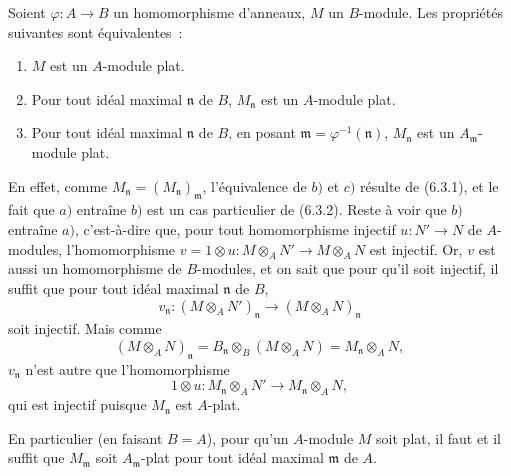 \begin{env}[6.3.3]
\label{0.6.3.3-fr}
Soient $\varphi:A\to B$ un homomorphisme d'anneaux, $M$ un $B$-module. Les
propriétés suivantes sont équivalentes~:
\begin{enumerate}
  \item[$a)$] $M$ est un $A$-module plat.
  \item[$b)$] Pour tout idéal maximal $\mathfrak{n}$ de $B$,
    $M_\mathfrak{n}$ est un $A$-module plat.
  \item[$c)$] Pour tout idéal maximal $\mathfrak{n}$ de $B$, en posant
    $\mathfrak{m}=\varphi^{-1}(\mathfrak{n})$, $M_\mathfrak{n}$ est un
    $A_\mathfrak{m}$-module plat.
\end{enumerate}

En effet, comme $M_\mathfrak{n}=(M_\mathfrak{n})_\mathfrak{m}$,
l'équivalence de $b)$ et $c)$ résulte de (6.3.1), et le fait que $a)$
entraîne $b)$ est un cas particulier de (6.3.2). Reste à voir que $b)$
entraîne $a)$,
c'est-à-dire que, pour tout homomorphisme injectif $u:N'\to N$ de
$A$-modules, l'homomorphisme
$v=1\otimes u:M\otimes_A N'\to M\otimes_A N$ est injectif. Or, $v$ est aussi
un homomorphisme de $B$-modules, et on sait que pour qu'il soit injectif, il
suffit que pour tout idéal maximal $\mathfrak{n}$ de $B$,
\[
  v_\mathfrak{n}:(M\otimes_A N')_\mathfrak{n}
  \longrightarrow(M\otimes_A N)_\mathfrak{n}
\]
soit injectif. Mais comme
\[
  (M\otimes_A N)_\mathfrak{n}
  =B_\mathfrak{n}\otimes_B(M\otimes_A N)
  =M_\mathfrak{n}\otimes_A N,
\]
$v_\mathfrak{n}$ n'est autre que l'homomorphisme
\[
  1\otimes u:M_\mathfrak{n}\otimes_A N'
  \longrightarrow M_\mathfrak{n}\otimes_A N,
\]
qui est injectif puisque $M_\mathfrak{n}$ est $A$-plat.

En particulier (en faisant $B=A$), pour qu'un $A$-module $M$ soit plat, il
faut et il suffit que $M_\mathfrak{m}$ soit $A_\mathfrak{m}$-plat pour tout
idéal maximal $\mathfrak{m}$ de $A$.
\end{env}

